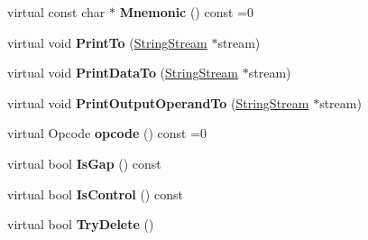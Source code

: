 \begin{DoxyCompactItemize}
\item 
virtual const char $\ast$ {\bfseries Mnemonic} () const  =0\hypertarget{classv8_1_1internal_1_1_l_instruction_ae256d0dcc2d6017d8c49d382254dccee}{}\label{classv8_1_1internal_1_1_l_instruction_ae256d0dcc2d6017d8c49d382254dccee}

\item 
virtual void {\bfseries Print\+To} (\hyperlink{classv8_1_1internal_1_1_string_stream}{String\+Stream} $\ast$stream)\hypertarget{classv8_1_1internal_1_1_l_instruction_a7fd3ca39e41f221d7dd97c947219770c}{}\label{classv8_1_1internal_1_1_l_instruction_a7fd3ca39e41f221d7dd97c947219770c}

\item 
virtual void {\bfseries Print\+Data\+To} (\hyperlink{classv8_1_1internal_1_1_string_stream}{String\+Stream} $\ast$stream)\hypertarget{classv8_1_1internal_1_1_l_instruction_a3e3375f04ff4ab46cd75200cfa1b918d}{}\label{classv8_1_1internal_1_1_l_instruction_a3e3375f04ff4ab46cd75200cfa1b918d}

\item 
virtual void {\bfseries Print\+Output\+Operand\+To} (\hyperlink{classv8_1_1internal_1_1_string_stream}{String\+Stream} $\ast$stream)\hypertarget{classv8_1_1internal_1_1_l_instruction_af5f97137ae7c1b7af3737b41c235f28f}{}\label{classv8_1_1internal_1_1_l_instruction_af5f97137ae7c1b7af3737b41c235f28f}

\item 
virtual Opcode {\bfseries opcode} () const  =0\hypertarget{classv8_1_1internal_1_1_l_instruction_aa0129e8a782b2dd3d9753986e3d245f1}{}\label{classv8_1_1internal_1_1_l_instruction_aa0129e8a782b2dd3d9753986e3d245f1}

\item 
virtual bool {\bfseries Is\+Gap} () const \hypertarget{classv8_1_1internal_1_1_l_instruction_a96115165585397545ac4945072c27dfc}{}\label{classv8_1_1internal_1_1_l_instruction_a96115165585397545ac4945072c27dfc}

\item 
virtual bool {\bfseries Is\+Control} () const \hypertarget{classv8_1_1internal_1_1_l_instruction_a2cc159f22c6519accebaa83d4e554dd7}{}\label{classv8_1_1internal_1_1_l_instruction_a2cc159f22c6519accebaa83d4e554dd7}

\item 
virtual bool {\bfseries Try\+Delete} ()\hypertarget{classv8_1_1internal_1_1_l_instruction_ae33f8094c99e0ec89bc4020a5de93187}{}\label{classv8_1_1internal_1_1_l_instruction_ae33f8094c99e0ec89bc4020a5de93187}


\end{DoxyCompactItemize}
